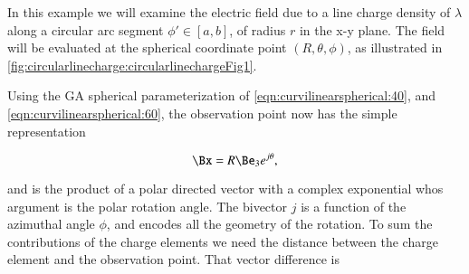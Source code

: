 %
%
In this example we will examine the electric field due to a line charge density of \( \lambda \) along a circular arc segment \( \phi' \in [a,b] \), of radius \( r \) in the x-y plane.
The field will be evaluated at the
spherical coordinate point \( (R, \theta, \phi) \), as illustrated in \cref{fig:circularlinecharge:circularlinechargeFig1}.


Using the GA spherical parameterization of \cref{eqn:curvilinearspherical:40}, and \cref{eqn:curvilinearspherical:60}, the
%
%
%
%
observation point now has the simple representation

\begin{dmath}\label{eqn:circularlinecharge:60}
\Bx = R \Be_3 e^{j \theta },
\end{dmath}

and is the product of a polar directed vector with a complex exponential whos argument is the polar rotation angle.
The bivector \( j \) is a function of the azimuthal angle \( \phi \), and encodes all the geometry of the rotation.
To sum the contributions of the charge elements we need the distance between the charge element and the observation point.
That vector difference is

